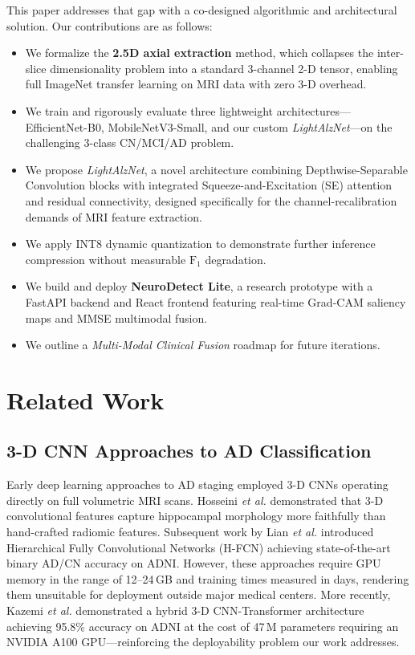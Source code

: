 \documentclass[conference]{IEEEtran}
\newcommand{\etal}{\textit{et al.}\xspace}
\newcommand{\modelname}{\textit{LightAlzNet}\xspace}
\newcommand{\F}{\mathrm{F_1}}
\begin{document}
This paper addresses that gap with a co-designed algorithmic
and architectural solution. Our contributions are as follows:
\begin{itemize}
  \item We formalize the \textbf{2.5D axial extraction} method,
        which collapses the inter-slice dimensionality problem
        into a standard 3-channel 2-D tensor, enabling full
        ImageNet transfer learning on MRI data with zero 3-D
        overhead.
  \item We train and rigorously evaluate three lightweight
        architectures---EfficientNet-B0, MobileNetV3-Small, and
        our custom \modelname---on the challenging 3-class
        CN/MCI/AD problem.
  \item We propose \modelname, a novel architecture combining
        Depthwise-Separable Convolution blocks with integrated
        Squeeze-and-Excitation (SE) attention and residual
        connectivity, designed specifically for the
        channel-recalibration demands of MRI feature extraction.
  \item We apply INT8 dynamic quantization to demonstrate
        further inference compression without measurable
        $\F$ degradation.
  \item We build and deploy \textbf{NeuroDetect Lite}, a
        research prototype with a FastAPI backend and React
        frontend featuring real-time Grad-CAM saliency maps
        and MMSE multimodal fusion.
  \item We outline a \emph{Multi-Modal Clinical Fusion} roadmap
        for future iterations.
\end{itemize}

\section{Related Work}
\label{sec:related}

\subsection{3-D CNN Approaches to AD Classification}
Early deep learning approaches to AD staging employed 3-D CNNs
operating directly on full volumetric MRI scans. Hosseini \etal
\cite{hosseini2016} demonstrated that 3-D convolutional features
capture hippocampal morphology more faithfully than hand-crafted
radiomic features. Subsequent work by Lian \etal \cite{lian2020}
introduced Hierarchical Fully Convolutional Networks (H-FCN)
achieving state-of-the-art binary AD/CN accuracy on ADNI.
However, these approaches require GPU memory in the range of
12--24\,GB and training times measured in days, rendering them
unsuitable for deployment outside major medical centers. More
recently, Kazemi \etal \cite{kazemi2025} demonstrated a hybrid
3-D CNN-Transformer architecture achieving 95.8\% accuracy on
ADNI at the cost of 47\,M parameters requiring an NVIDIA A100
GPU---reinforcing the deployability problem our work addresses.
\end{document}
